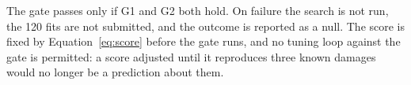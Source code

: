 \documentclass[11pt]{article}
\begin{document}
\noindent The gate passes only if G1 and G2 both hold. On failure the search is not run, the 120 fits are not submitted, and the outcome is reported as a null. The score is fixed by Equation~\eqref{eq:score} before the gate runs, and no tuning loop against the gate is permitted: a score adjusted until it reproduces three known damages would no longer be a prediction about them.





\end{document}
